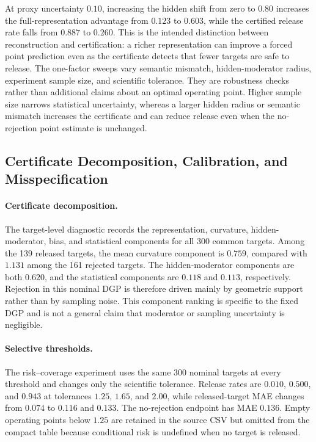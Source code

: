 \documentclass[11pt]{article}
\numberwithin{equation}{section}
\newcommand{\1}{\mathbf 1}
\begin{document}


At proxy uncertainty $0.10$, increasing the hidden shift from zero to $0.80$ increases the full-representation advantage from $0.123$ to $0.603$, while the certified release rate falls from $0.887$ to $0.260$.  This is the intended distinction between reconstruction and certification: a richer representation can improve a forced point prediction even as the certificate detects that fewer targets are safe to release.  The one-factor sweeps vary semantic mismatch, hidden-moderator radius, experiment sample size, and scientific tolerance.  They are robustness checks rather than additional claims about an optimal operating point.  Higher sample size narrows statistical uncertainty, whereas a larger hidden radius or semantic mismatch increases the certificate and can reduce release even when the no-rejection point estimate is unchanged.


\subsection{Certificate Decomposition, Calibration, and Misspecification}
\label{app:certificate-calibration}
\suppressfloats[t]

\paragraph{Certificate decomposition.}
The target-level diagnostic records the representation, curvature, hidden-moderator, bias, and statistical components for all 300 common targets.  Among the 139 released targets, the mean curvature component is $0.759$, compared with $1.131$ among the 161 rejected targets.  The hidden-moderator components are both $0.620$, and the statistical components are $0.118$ and $0.113$, respectively.  Rejection in this nominal DGP is therefore driven mainly by geometric support rather than by sampling noise.  This component ranking is specific to the fixed DGP and is not a general claim that moderator or sampling uncertainty is negligible.



\paragraph{Selective thresholds.}
The risk--coverage experiment uses the same 300 nominal targets at every threshold and changes only the scientific tolerance.  Release rates are $0.010$, $0.500$, and $0.943$ at tolerances $1.25$, $1.65$, and $2.00$, while released-target MAE changes from $0.074$ to $0.116$ and $0.133$.  The no-rejection endpoint has MAE $0.136$.  Empty operating points below $1.25$ are retained in the source CSV but omitted from the compact table because conditional risk is undefined when no target is released.
\end{document}
